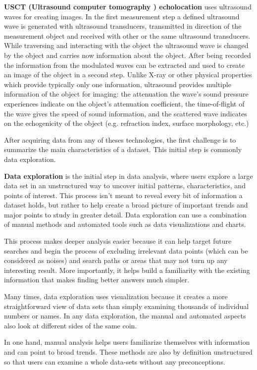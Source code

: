 \textbf{ USCT (Ultrasound computer tomography ) echolocation }  uses ultrasound waves for creating images. In the first measurement step a defined ultrasound wave is generated with  ultrasound transducers, transmitted in direction of the measurement object and received with other or the same ultrasound transducers. While traversing and interacting with the object the ultrasound wave is changed by the object and carries now information about the object. After being recorded the information from the modulated waves can be extracted and used to create an image of the object in a second step. Unlike X-ray or other physical properties which provide typically only one information, ultrasound provides multiple information of the object for imaging: the attenuation the wave's sound pressure experiences indicate on the object's attenuation coefficient, the time-of-flight of the wave gives the speed of sound information, and the scattered wave indicates on the echogenicity of the object (e.g. refraction index, surface morphology, etc.)


After acquiring data from any of theses technologies, the first challenge is to summarize the main characteristics of a dataset. This initial step is commonly data exploration.

\textbf{Data exploration} is the initial step in data analysis, where users explore a large data set in an unstructured way to uncover initial patterns, characteristics, and points of interest. This process isn’t meant to reveal every bit of information a dataset holds, but rather to help create a broad picture of important trends and major points to study in greater detail. Data exploration can use a combination of manual methods and automated tools such as data visualizations and charts.

This process makes deeper analysis easier because it can help target future searches and begin the process of excluding irrelevant data points (which can be considered as noises) and search paths or areas that may not turn up any interesting result. More importantly, it helps build a familiarity with the existing information that makes finding better answers much simpler.

Many times, data exploration uses visualization because it creates a more straightforward view of data sets than simply examining thousands of individual numbers or names. In any data exploration, the manual and automated aspects also look at different sides of the same coin.


In one hand, manual analysis helps users familiarize themselves with information and can point to broad trends. These methods are also by definition unstructured so that users can examine a whole data-sets without any preconceptions.

